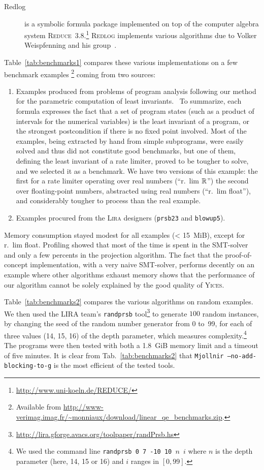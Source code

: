 \begin{description}
\item[Redlog\footnotemark] is a symbolic formula package implemented on top of the computer algebra system \textsc{Reduce}~3.8.\footnote{\url{http://www.uni-koeln.de/REDUCE/}} \textsc{Redlog} implements various algorithms due to Volker Weispfenning and his group~\cite{LW93}.
\end{description}

Table~\ref{tab:benchmarks1} compares these various implementations on a few benchmark examples
\footnote{Available from \url{http://www-verimag.imag.fr/~monniaux/download/linear_qe_benchmarks.zip}.} coming from two sources:
\begin{enumerate}
\item Examples produced from problems of program analysis following our method for the parametric computation of least invariants.~\cite{Monniaux_SAS07}
To summarize, each formula expresses the fact that a set of program states (such as a product of intervals for the numerical variables) is the least invariant of a program, or the strongest postcondition if there is no fixed point involved. Most of the examples, being extracted by hand from simple subprograms, were easily solved and thus did not constitute good benchmarks, but one of them, defining the least invariant of a rate limiter, proved to be tougher to solve, and we selected it as a benchmark. We have two versions of this example: the first for a rate limiter operating over real numbers (``r.~lim $\mathbb{R}$'')
the second over floating-point numbers, abstracted using real numbers (``r.~lim float''), and considerably tougher to process than the real example.
\item Examples procured from the \textsc{Lira} designers (\texttt{prsb23} and \texttt{blowup5}).
\end{enumerate}

Memory consumption stayed modest for all examples (< 15~MiB), except for r.~lim float.
Profiling showed that most of the time is spent in the SMT-solver and only a few percents in the projection algorithm. The fact that the proof-of-concept implementation, with a very naive SMT-solver, performs decently on an example where other algorithms exhaust memory shows that the performance of our algorithm cannot be solely explained by the good quality of \textsc{Yices}.

Table~\ref{tab:benchmarks2} compares the various algorithms on random examples.
We then used the LIRA team's \texttt{randprsb} tool\footnote{\url{http://lira.gforge.avacs.org/toolpaper/randPrsb.hs}}
to generate $100$ random instances, by changing the seed of the random
number generator from 0 to~99, for each of three values (14, 15, 16) of the depth parameter, which measures complexity.\footnote{We used the command line \texttt{randprsb 0 7 -10 10 $n$ $i$} where $n$ is the depth parameter (here, 14, 15 or 16) and $i$ ranges in $[0,99]$.}
The programs were then tested with both
a 1.8~GiB memory limit and a timeout of five minutes.
It is clear from Tab.~\ref{tab:benchmarks2} that
\texttt{Mjollnir --no-add-blocking-to-g} is the most efficient of the
tested tools.

